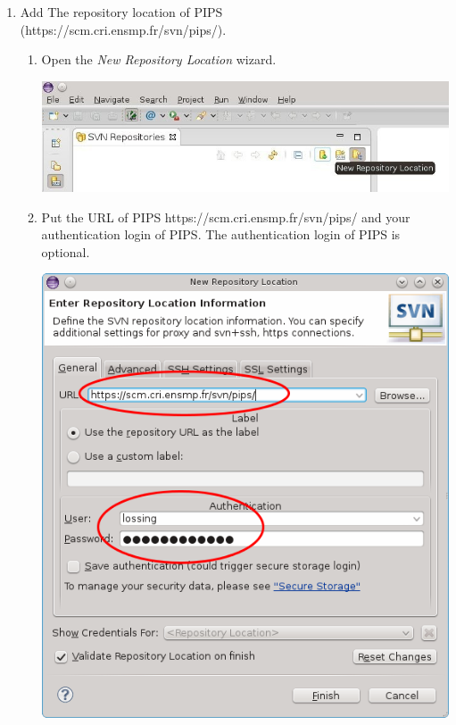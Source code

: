 \documentclass[a4paper]{article}
\begin{document}
\begin{enumerate}
\item Add The repository location of PIPS \\(https://scm.cri.ensmp.fr/svn/pips/).
\begin{enumerate}
\item Open the \emph{New Repository Location} wizard.
\begin{center}
\noindent
\includegraphics[scale=0.4]{eclipse/02-eclipseJUNO-newRepositories2.jpg}
\end{center}

\item Put the URL of PIPS https://scm.cri.ensmp.fr/svn/pips/ and your authentication login of PIPS. 
The authentication login of PIPS is optional. 
\begin{center}
\noindent
\includegraphics[scale=0.4]{eclipse/02-eclipseJUNO-newRepositories3.png}
\end{center}


\end{enumerate}
\end{enumerate}
\end{document}
